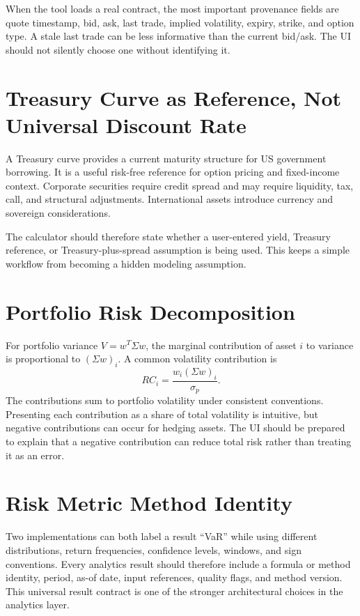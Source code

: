 \documentclass[11pt]{article}
\begin{document}
When the tool loads a real contract, the most important provenance fields are quote timestamp, bid, ask, last trade, implied volatility, expiry, strike, and option type. A stale last trade can be less informative than the current bid/ask. The UI should not silently choose one without identifying it.

\section{Treasury Curve as Reference, Not Universal Discount Rate}
A Treasury curve provides a current maturity structure for US government borrowing. It is a useful risk-free reference for option pricing and fixed-income context. Corporate securities require credit spread and may require liquidity, tax, call, and structural adjustments. International assets introduce currency and sovereign considerations.

The calculator should therefore state whether a user-entered yield, Treasury reference, or Treasury-plus-spread assumption is being used. This keeps a simple workflow from becoming a hidden modeling assumption.

\section{Portfolio Risk Decomposition}
For portfolio variance $V=w^T\Sigma w$, the marginal contribution of asset $i$ to variance is proportional to $(\Sigma w)_i$. A common volatility contribution is
\begin{equation}
RC_i=\frac{w_i(\Sigma w)_i}{\sigma_p}.
\end{equation}
The contributions sum to portfolio volatility under consistent conventions. Presenting each contribution as a share of total volatility is intuitive, but negative contributions can occur for hedging assets. The UI should be prepared to explain that a negative contribution can reduce total risk rather than treating it as an error.

\section{Risk Metric Method Identity}
Two implementations can both label a result ``VaR'' while using different distributions, return frequencies, confidence levels, windows, and sign conventions. Every analytics result should therefore include a formula or method identity, period, as-of date, input references, quality flags, and method version. This universal result contract is one of the stronger architectural choices in the analytics layer.
\end{document}
